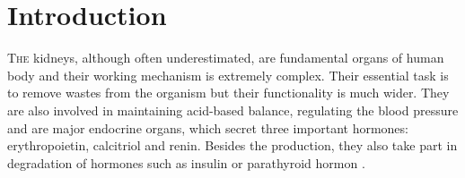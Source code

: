 	\setcounter{page}{1}
	
\chapter*{Introduction}
	
\lettrine[lines=3]{T}{he} kidneys, although often underestimated, are fundamental organs of human body and their working mechanism is extremely complex. Their essential task is to remove wastes from the organism but their functionality is much wider. They are also involved in maintaining acid-based balance, regulating the blood pressure and are major endocrine organs, which secret three important hormones: erythropoietin, calcitriol and renin. Besides the production, they also take part in degradation of hormones such as insulin or parathyroid hormon \cite{saladin}.